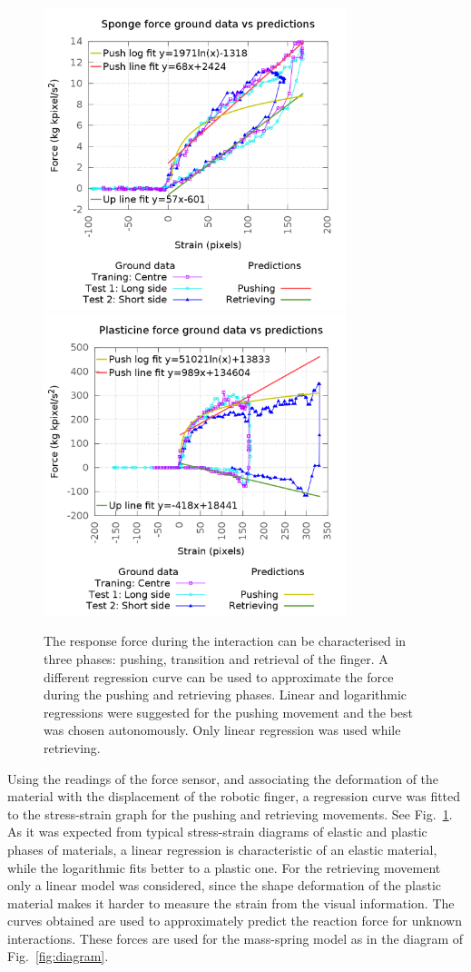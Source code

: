 \documentclass[journal]{IEEEtran}
\newcommand{\fref}[1]{Fig.~\ref{#1}}
\begin{document}
\begin{figure}[!t]
\centering
\includegraphics[width=88mm]{arrio4}
\includegraphics[width=88mm]{arrio5}
\caption{The response force during the interaction can be characterised in three phases: pushing, transition and retrieval of the finger.  A different regression curve can be used to approximate the force during the pushing and retrieving phases.  Linear and logarithmic regressions were suggested for the pushing movement and the best was chosen autonomously.  Only linear regression was used while retrieving.}\label{fig:sstrain}
\end{figure}

Using the readings of the force sensor, and associating the deformation of the material with the displacement of the robotic finger, a regression curve was fitted to the stress-strain graph for the pushing and retrieving movements.  See \fref{fig:sstrain}.  As it was expected from typical stress-strain diagrams of elastic and plastic phases of materials, a linear regression is characteristic of an elastic material, while the logarithmic fits better to a plastic one.  For the retrieving movement only a linear model was considered, since the shape deformation of the plastic material makes it harder to measure the strain from the visual information.  The curves obtained are used to approximately predict the reaction force for unknown interactions.  These forces are used for the mass-spring model as in the diagram of \fref{fig:diagram}.
\end{document}
